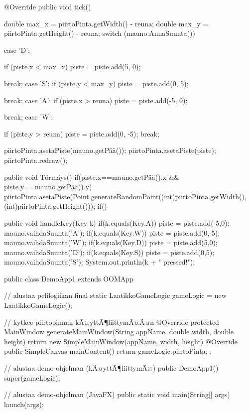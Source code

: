 \begin{javacode}
{    @Override
    public void tick() {
        double max_x = piirtoPinta.getWidth() - reuna;
        double max_y = piirtoPinta.getHeight() - reuna;
        switch (mauno.AnnaSuunta()) {
       
            case 'D':
            	
                if (piste.x < max_x) {
                	piste = piste.add(5, 0);
                }
                
                
                
                break;
            case 'S':
                if (piste.y < max_y)
                    piste = piste.add(0, 5);
                
                break;
            case 'A':
                if (piste.x > reuna)
                    piste = piste.add(-5, 0);
                
                break;
            case 'W':
            	
                if (piste.y > reuna)
                    piste = piste.add(0, -5);
                break;
        }
        
        piirtoPinta.asetaPiste(mauno.getPää());
        piirtoPinta.asetaPiste(piste);
        piirtoPinta.redraw();
    }

public void Törmäys() {
	if(piste.x==mauno.getPää().x && piste.y==mauno.getPää().y) {
		piirtoPinta.asetaPiste(Point.generateRandomPoint((int)piirtoPinta.getWidth(),(int)piirtoPinta.getHeight()));
	}
	if()
}

public void handleKey(Key k) {
	if(k.equals(Key.A)) {
		piste = piste.add(-5,0);
		mauno.vaihdaSuunta('A');
	}
	if(k.equals(Key.W)) {
		piste = piste.add(0,-5);
		mauno.vaihdaSuunta('W');
	}
	if(k.equals(Key.D)) {
		piste = piste.add(5,0);
		mauno.vaihdaSuunta('D');
	}
	if(k.equals(Key.S)) {
		piste = piste.add(0,5);
		mauno.vaihdaSuunta('S');
	}
	System.out.println(k + " pressed!"); 
}
}


public class DemoApp1 extends OOMApp {
    // alustaa pelilogiikan
    final static LaatikkoGameLogic gameLogic = new LaatikkoGameLogic();

    // kytkee piirtopinnan kÃ¤yttÃ¶liittymÃ¤Ã¤n
    @Override
    protected MainWindow generateMainWindow(String appName, double width, double height) {
        return new SimpleMainWindow(appName, width, height) {
            @Override public SimpleCanvas mainContent() {
                return gameLogic.piirtoPinta;
            }
        };
    }

    // alustaa demo-ohjelman (kÃ¤yttÃ¶liittymÃ¤)
    public DemoApp1() {
        super(gameLogic);
    }

    // alustaa demo-ohjelman (JavaFX)
    public static void main(String[] args) {
        launch(args);
    }

}
\end{javacode}


